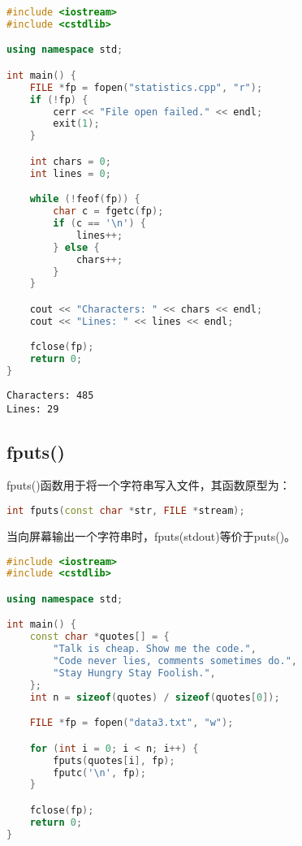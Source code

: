 \vspace{0.5cm}


\begin{lstlisting}[language=C++]
#include <iostream>
#include <cstdlib>

using namespace std;

int main() {
    FILE *fp = fopen("statistics.cpp", "r");
    if (!fp) {
        cerr << "File open failed." << endl;
        exit(1);
    }

    int chars = 0;
    int lines = 0;

    while (!feof(fp)) {
        char c = fgetc(fp);
        if (c == '\n') {
            lines++;
        } else {
            chars++;
        }
    }

    cout << "Characters: " << chars << endl;
    cout << "Lines: " << lines << endl;

    fclose(fp);
    return 0;
}
\end{lstlisting}

\begin{tcolorbox}
    \begin{verbatim}
Characters: 485
Lines: 29
	\end{verbatim}
\end{tcolorbox}

\vspace{0.5cm}

\subsection{fputs()}

fputs()函数用于将一个字符串写入文件，其函数原型为：

\vspace{-0.5cm}

\begin{lstlisting}[language=C++]
int fputs(const char *str, FILE *stream);
\end{lstlisting}

当向屏幕输出一个字符串时，fputs(stdout)等价于puts()。\\


\begin{lstlisting}[language=C++]
#include <iostream>
#include <cstdlib>

using namespace std;

int main() {
    const char *quotes[] = {
        "Talk is cheap. Show me the code.",
        "Code never lies, comments sometimes do.",
        "Stay Hungry Stay Foolish.",
    };
    int n = sizeof(quotes) / sizeof(quotes[0]);

    FILE *fp = fopen("data3.txt", "w");

    for (int i = 0; i < n; i++) {
        fputs(quotes[i], fp);
        fputc('\n', fp);
    }

    fclose(fp);
    return 0;
}
\end{lstlisting}

